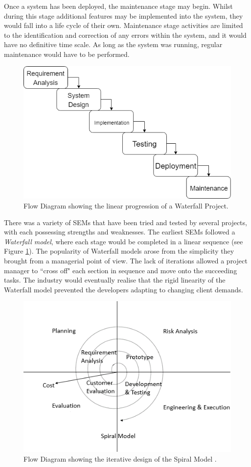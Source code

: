 \documentclass[final]{cmpreport}
\begin{document}
			Once a system has been deployed, the maintenance stage may begin. Whilst during this stage additional features may be implemented into the system, they would fall into a life cycle of their own. Maintenance stage activities are limited to the identification and correction of any errors within the system, and it would have no definitive time scale. As long as the system was running, regular maintenance would have to be performed.
						
			\begin{figure}[h]
				\centering
				\includegraphics[width=0.8\linewidth]{waterfall.png}
				\caption[Waterfall Flow Diagram]{Flow Diagram showing the linear progression of a Waterfall Project.} \label{fig:waterfall}
			\end{figure}
			
			There was a variety of SEMs that have been tried and tested by several projects, with each possessing strengths and weaknesses. The earliest SEMs followed a \emph{Waterfall model}, where each stage would be completed in a linear sequence (see Figure \ref{fig:waterfall}). The popularity of Waterfall models arose from the simplicity they brought from a managerial point of view. The lack of iterations allowed a project manager to ``cross off" each section in sequence and move onto the succeeding tasks. The industry would eventually realise that the rigid linearity of the Waterfall model prevented the developers adapting to changing client demands. 
			
			\begin{figure}
				\centering
				\includegraphics[width=0.8\linewidth]{spiral.png}
				\caption[Spiral Model Flow Diagram]{Flow Diagram showing the iterative design of the Spiral Model \citep{spiral-model-source}.} \label{fig:spiral}
			\end{figure}
			
\end{document}
